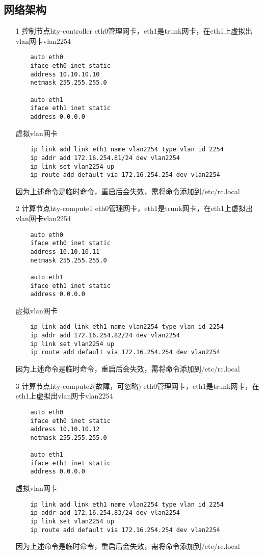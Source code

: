 \documentclass[a4paper,left=1.5cm,right=1.5cm,11pt]{article}
\begin{document}
\subsection{网络架构}
\begin{itemize}
	\item[1]控制节点hty-controller
	eth0管理网卡，eth1是trunk网卡，在eth1上虚拟出vlan网卡vlan2254
	\begin{lstlisting}
	auto eth0
	iface eth0 inet static
	address 10.10.10.10
	netmask 255.255.255.0

	auto eth1
	iface eth1 inet static
	address 0.0.0.0
	\end{lstlisting}
	虚拟vlan网卡
	\begin{lstlisting}
	ip link add link eth1 name vlan2254 type vlan id 2254
	ip addr add 172.16.254.81/24 dev vlan2254
	ip link set vlan2254 up 
	ip route add default via 172.16.254.254 dev vlan2254
	\end{lstlisting}
	因为上述命令是临时命令，重启后会失效，需将命令添加到/etc/rc.local

	\item[2]计算节点hty-compute1
	eth0管理网卡，eth1是trunk网卡，在eth1上虚拟出vlan网卡vlan2254
	\begin{lstlisting}
	auto eth0
	iface eth0 inet static
	address 10.10.10.11
	netmask 255.255.255.0

	auto eth1
	iface eth1 inet static
	address 0.0.0.0
	\end{lstlisting}
	虚拟vlan网卡
	\begin{lstlisting}
	ip link add link eth1 name vlan2254 type vlan id 2254
	ip addr add 172.16.254.82/24 dev vlan2254
	ip link set vlan2254 up 
	ip route add default via 172.16.254.254 dev vlan2254
	\end{lstlisting}
	因为上述命令是临时命令，重启后会失效，需将命令添加到/etc/rc.local

	\item[3]计算节点hty-compute2(故障，可忽略)
	eth0管理网卡，eth1是trunk网卡，在eth1上虚拟出vlan网卡vlan2254
	\begin{lstlisting}
	auto eth0
	iface eth0 inet static
	address 10.10.10.12
	netmask 255.255.255.0

	auto eth1
	iface eth1 inet static
	address 0.0.0.0
	\end{lstlisting}
	虚拟vlan网卡
	\begin{lstlisting}
	ip link add link eth1 name vlan2254 type vlan id 2254
	ip addr add 172.16.254.83/24 dev vlan2254
	ip link set vlan2254 up 
	ip route add default via 172.16.254.254 dev vlan2254
	\end{lstlisting}
	因为上述命令是临时命令，重启后会失效，需将命令添加到/etc/rc.local


\end{itemize}
\end{document}
